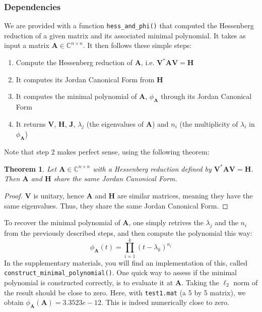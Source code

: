 \documentclass[11pt]{article}
\newtheorem{theorem}{Theorem}[section]
\numberwithin{equation}{section}
\begin{document}
\subsubsection{Dependencies}
We are provided with a function \texttt{hess\_and\_phi()} that computed the Hessenberg reduction of a given matrix and its associated minimal polynomial. It takes as input a matrix $\mathbf{A}\in\mathbb{C}^{n\times n}$. It then follows these simple steps:
\begin{enumerate}
    \item Compute the Hessenberg reduction of $\mathbf{A}$, i.e. $\mathbf{V}^*\mathbf{A}\mathbf{V} = \mathbf{H}$
    \item It computes its Jordan Canonical Form from $\mathbf{H}$
    \item It computes the minimal polynomial of $\mathbf{A}$, $\phi_{\mathbf{A}}$ through its Jordan Canonical Form
    \item It returns $\mathbf{V}$, $\mathbf{H}$, $\mathbf{J}$, $\lambda_j$ (the eigenvalues of $\mathbf{A}$) and $n_i$ (the multiplicity of $\lambda_i$ in $\phi_{\mathbf{A}}$) 
\end{enumerate}
Note that step 2 makes perfect sense, using the following theorem:
\begin{theorem}
    Let $\mathbf{A}\in\mathbb{C}^{n\times n}$ with a Hessenberg reduction defined by $\mathbf{V}^*\mathbf{A}\mathbf{V} = \mathbf{H}$. Then $\mathbf{A}$ and $\mathbf{H}$ share the same Jordan Canonical Form.
\end{theorem}
\begin{proof}
    $\mathbf{V}$ is unitary, hence $\mathbf{A}$ and $\mathbf{H}$ are similar matrices, meaning they have the same eigenvalues. Thus, they share the same Jordan Canonical Form.
\end{proof}
To recover the minimal polynomial of $\mathbf{A}$, one simply retrives the $\lambda_j$ and the $n_i$ from the previously described steps, and then compute the polynomial this way:
\begin{equation*}
    \phi_{\mathbf{A}}(t) = \prod_{i=1}^{k}(t-\lambda_k)^{n_i}
\end{equation*}
In the supplementary materials, you will find an implementation of this, called\\ \texttt{construct\_minimal\_polynomial()}. One quick way to assess if the minimal polynomial is constructed correctly, is to evaluate it at $\mathbf{A}$. Taking the $\ell_2$ norm of the result should be close to zero. Here, with \texttt{test1.mat} (a 5 by 5 matrix), we obtain $\phi_{\mathbf{A}}(\mathbf{A}) = 3.3523e-12$. This is indeed numerically close to zero.
\end{document}

